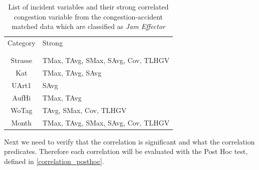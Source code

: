 \begin{table}[h!]
	\centering
	\begin{tabular}{c|l}  
		Category & Strong \\
		\\[-1em]
		\hline
		\\[-1em]
		Strasse & TMax, TAvg, SMax, SAvg, Cov, TLHGV \\ 
 		Kat & TMax, TAvg, SAvg \\ %
 		UArt1 & SAvg \\ %
 		AufHi & TMax, TAvg \\
 		WoTag & TAvg, SMax, Cov, TLHGV \\ %
 		Month & TMax, TAvg, SMax, SAvg, Cov, TLHGV \\ %
	\end{tabular}
    \caption{List of incident variables and their strong correlated congestion variable from the congestion-accident matched data which are classified as \textit{Jam Effector}}
	\label{tbl:correlation_list_baysis_effector}
\end{table}
Next we need to verify that the correlation is significant and what the correlation predicates. Therefore each correlation will be evaluated with the Post Hoc test, defined in \cref{correlation_posthoc}. 
